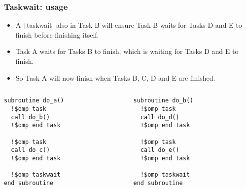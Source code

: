 \documentclass{beamer}
\begin{document}
\begin{frame}[fragile]
\frametitle{Taskwait: usage}

\begin{itemize}
  \item A \texttt|taskwait| also in Task B will ensure Task B waits for Tasks D and E to finish before finishing itself.
  \item Task A waits for Tasks B to finish, which is waiting for Tasks D and E to finish.
  \item So Task A will now finish when Tasks B, C, D and E are finished.
\end{itemize}

\begin{columns}
\begin{column}{0.5\textwidth}
\begin{verbatim}
subroutine do_a()
  !$omp task
  call do_b()
  !$omp end task

  !$omp task
  call do_c()
  !$omp end task

  !$omp taskwait
end subroutine

\end{verbatim}
\end{column}

\begin{column}{0.5\textwidth}
\begin{verbatim}
subroutine do_b()
  !$omp task
  call do_d()
  !$omp end task

  !$omp task
  call do_e()
  !$omp end task

  !$omp taskwait
end subroutine
\end{verbatim}
\end{column}

\end{columns}
\end{frame}
\end{document}

